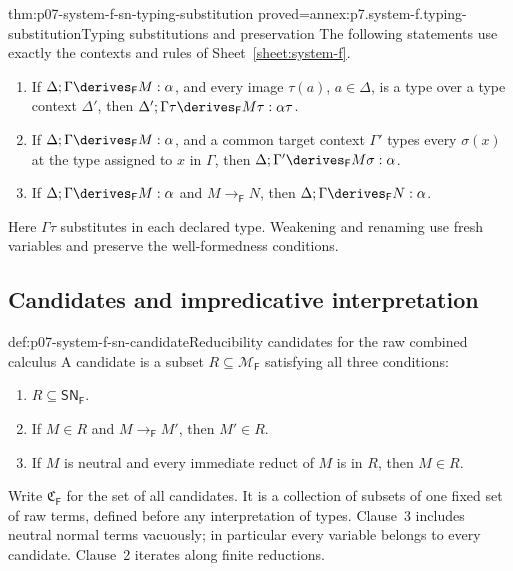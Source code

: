 \begin{hblemma}{thm:p07-system-f-sn-typing-substitution}
 {proved=annex:p7.system-f.typing-substitution}{Typing substitutions and preservation}
The following statements use exactly the contexts and rules of
Sheet~\ref{sheet:system-f}.
\begin{enumerate}
\item If \(\Delta;\Gamma\derives_{\mathsf F}M:\alpha\), and every
      image \(\tau(a)\), \(a\in\Delta\), is a type over a type context
      \(\Delta'\), then
      \(\Delta';\Gamma\tau\derives_{\mathsf F}M\tau:\alpha\tau\).
\item If \(\Delta;\Gamma\derives_{\mathsf F}M:\alpha\), and a common
      target context \(\Gamma'\) types every \(\sigma(x)\) at the
      type assigned to \(x\) in \(\Gamma\), then
      \(\Delta;\Gamma'\derives_{\mathsf F}M\sigma:\alpha\).
\item If \(\Delta;\Gamma\derives_{\mathsf F}M:\alpha\) and
      \(M\to_{\mathsf F}N\), then
      \(\Delta;\Gamma\derives_{\mathsf F}N:\alpha\).
\end{enumerate}
Here \(\Gamma\tau\) substitutes in each declared type. Weakening and
renaming use fresh variables and preserve the well-formedness conditions.
\end{hblemma}

\subsection{Candidates and impredicative interpretation}
\label{sec:p07-system-f-sn-candidates}

\begin{hbdefinition}{def:p07-system-f-sn-candidate}{Reducibility candidates for the raw combined calculus}
A candidate is a subset \(R\subseteq\mathcal M_{\mathsf F}\)
satisfying all three conditions:
\begin{enumerate}
\item \(R\subseteq\mathsf{SN}_{\mathsf F}\).
\item If \(M\in R\) and \(M\to_{\mathsf F}M'\), then \(M'\in R\).
\item If \(M\) is neutral and every immediate reduct of \(M\) is in
      \(R\), then \(M\in R\).
\end{enumerate}
Write \(\mathfrak C_{\mathsf F}\) for the set of all candidates.
It is a collection of subsets of one fixed set of raw terms, defined
before any interpretation of types. Clause~3 includes neutral normal
terms vacuously; in particular every variable belongs to every candidate.
Clause~2 iterates along finite reductions.
\end{hbdefinition}

